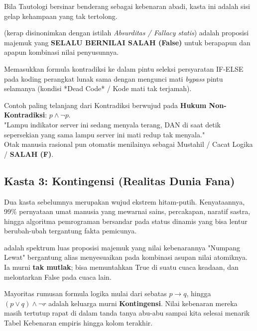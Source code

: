 Bila Tautologi bersinar benderang sebagai kebenaran abadi, kasta ini adalah sisi gelap kehampaan yang tak tertolong.

\begin{definisi}[Kontradiksi]
 (kerap disinonimkan dengan istilah \textit{Absurditas / Fallacy statis}) adalah proposisi majemuk yang \textbf{SELALU BERNILAI SALAH (False)} untuk berapapun dan apapun kombinasi nilai penyusunnya.
\end{definisi}

Memasukkan formula kontradiksi ke dalam pintu seleksi persyaratan IF-ELSE pada koding perangkat lunak sama dengan mengunci mati \textit{bypass} pintu selamanya (kondisi *Dead Code* / Kode mati tak terjamah).

\begin{contoh}
Contoh paling telanjang dari Kontradiksi berwujud pada \textbf{Hukum Non-Kontradiksi}: $p \wedge \neg p$. \\
"Lampu indikator server ini sedang menyala terang, DAN di saat detik sepersekian yang sama lampu server ini mati redup tak menyala." \\
Otak manusia rasional pun otomatis menilainya sebagai Mustahil / Cacat Logika / \textbf{SALAH (F)}.
\end{contoh}

\subsection{Kasta 3: Kontingensi (Realitas Dunia Fana)}

Dua kasta sebelumnya merupakan wujud ekstrem hitam-putih. Kenyataannya, 99\% pernyataan umat manusia yang mewarnai sains, percakapan, naratif sastra, hingga algoritma pemrograman bersandar pada status dinamis yang bisa lentur berubah-ubah tergantung fakta pemicunya. 

\begin{definisi}[Kontingensi]
 adalah spektrum luas proposisi majemuk yang nilai kebenarannya "Numpang Lewat" bergantung alias menyesuaikan pada kombinasi asupan nilai atomiknya. Ia murni \textbf{tak mutlak}; bisa memuntahkan True di suatu cuaca keadaan, dan melontarkan False pada cuaca lain.
\end{definisi}

Mayoritas rumusan formula logika mulai dari sebatas $p \rightarrow q$, hingga $(p \vee q) \wedge \neg r$ adalah keluarga murni \textbf{Kontingensi}. Nilai kebenaran mereka masih tertutup rapat di dalam tanda tanya abu-abu sampai kita selesai menarik Tabel Kebenaran empiris hingga kolom terakhir.
